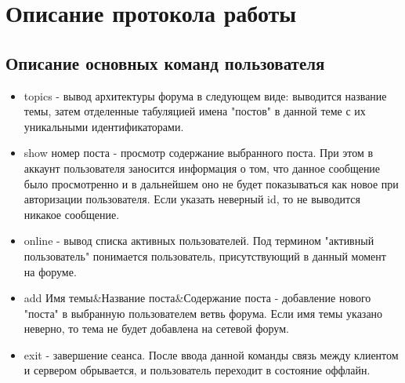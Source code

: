 \documentclass[10pt,a4paper]{report}
\begin{document}
\chapter{Описание протокола работы}
\section{Описание основных команд пользователя}
\begin{itemize}
\item topics - вывод архитектуры форума в следующем виде: выводится название темы, затем отделенные табуляцией имена "постов" в данной теме с их уникальными идентификаторами.
\item show номер поста - просмотр содержание выбранного поста. При этом в аккаунт пользователя заносится информация о том, что данное сообщение было просмотренно и в дальнейшем оно не будет показываться как новое при авторизации пользователя. Если указать неверный id, то не выводится никакое сообщение.
\item online - вывод списка активных пользователей. Под термином "активный пользователь" понимается пользователь, присутствующий в данный момент на форуме.
\item add Имя темы\&Название поста\&Содержание поста - добавление нового "поста" в выбранную пользователем ветвь форума. Если имя темы указано неверно, то тема не будет добавлена на сетевой форум.
\item exit - завершение сеанса. После ввода данной команды связь между клиентом и сервером обрывается, и пользователь переходит в состояние оффлайн.
\end{itemize}
\end{document}

